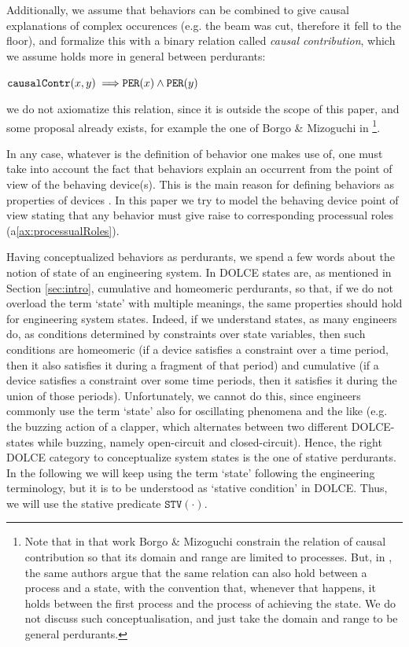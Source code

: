 \documentclass[sw]{iosart2x}
\newcommand{\bflist}{\begin{list}{}{\setlength{\topsep}{2mm}\setlength{\partopsep}{0mm}\setlength{\parsep}{0mm}\setlength{\leftmargin}{9mm}\setlength{\labelwidth}{8mm}}}
\newcommand{\eflist}{\end{list}}
\newcommand{\AxLabel}{\textrm{a}}
\newcounter{cntax}
\newcommand{\myax}[1]{\refstepcounter{cntax}\begin{small}{\bf \AxLabel\thecntax\label{ax:#1}}\end{small}}
\newcommand{\refax}[1]{({\AxLabel}\ref{#1})}
\newcommand{\generalStyle}[1]{\texttt{#1}}
\newcommand{\biRel}[3]{\generalStyle{#1}(#2,#3)}
\newcommand{\uniRel}[2]{\generalStyle{#1}(#2)}
\newcommand{\myfi}{\hspace{0.9mm} \Longrightarrow}
\newcommand{\DOLCE}{\textsc{DOLCE}\xspace} %
\newcommand{\DOLCEPerdurant}[1]{\uniRel{{PER}}{#1}}
\newcommand{\DOLCEStative}[1]{\uniRel{{STV}}{#1}}
\newcommand{\causallyContr}[2]{\biRel{causalContr}{#1}{#2}}
\newcommand{\firstTimeKeyWord}[1]{\textit{#1}}
\newcommand{\quotes}[1]{`#1'}
\begin{document}
Additionally, we assume that behaviors can be combined to give causal explanations of complex occurences (e.g. the beam was cut, therefore it fell to the floor), and formalize this with a binary relation called \firstTimeKeyWord{causal contribution}, which we assume holds more in general between perdurants:
\bflist
  \item[\myax{contribRange}] $ \causallyContr{x}{y} \myfi \DOLCEPerdurant{x} \land \DOLCEPerdurant{y} $
\eflist
we do not axiomatize this relation, since it is outside the scope of this paper, and some proposal already exists, for example the one of Borgo \& Mizoguchi in \cite{borgoFirstorderFormalizationEvent2014}\footnote{Note that in that work Borgo \& Mizoguchi constrain the relation of causal contribution so that its domain and range are limited to processes. But, in \cite{mizoguchiUnifyingDefinitionArtifact2016}, the same authors argue that the same relation can also hold between a process and a state, with the convention that, whenever that happens, it holds between the first process and the process of achieving the state.
We do not discuss such conceptualisation, and just take the domain and range to be general perdurants.}.

In any case, whatever is the definition of behavior one makes use of, one must take into account the fact that behaviors explain an occurrent from the point of view of the behaving device(s). This is the main reason for defining behaviors as properties of devices \cite{borgoFormalOntologicalPerspective2009}. In this paper we try to model the behaving device point of view stating that any behavior must give raise to corresponding processual roles \refax{ax:processualRoles}.


Having conceptualized behaviors as perdurants, we spend a few words about the notion of state of an engineering system.
In \DOLCE states are, as mentioned in Section \ref{sec:intro}, cumulative and homeomeric perdurants, so that, if we do not overload the term \quotes{state} with multiple meanings, the same properties should hold for engineering system states.
Indeed, if we understand states, as many engineers do, as conditions determined by constraints over state variables, then such conditions are homeomeric (if a device satisfies a constraint over a time period, then it also satisfies it during a fragment of that period) and cumulative (if a device satisfies a constraint over some time periods, then it satisfies it during the union of those periods).
Unfortunately, we cannot do this, since engineers commonly use the term \quotes{state} also for oscillating phenomena and the like (e.g. the buzzing action of a clapper, which alternates between two different \DOLCE-states while buzzing, namely open-circuit and closed-circuit). 
Hence, the right \DOLCE category to conceptualize system states is the one of stative perdurants. 
In the following we will keep using the term \quotes{state} following the engineering terminology, but it is to be understood as \quotes{stative condition} in \DOLCE. Thus, we will use the stative predicate $\DOLCEStative{\cdot}$.
\end{document}
